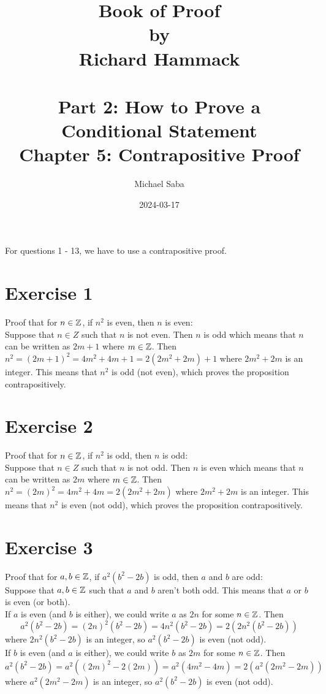 \documentclass[12pt]{article}
\title{%
    \Huge Book of Proof \\
    \large by \\
    \Large Richard Hammack \\~\\
    \huge Part 2: How to Prove a Conditional Statement \\
    \LARGE Chapter 5: Contrapositive Proof
}
\date{2024-03-17}
\author{Michael Saba}
\begin{document}
    \maketitle
    \newpage
    \setlength{\parindent}{0pt}

    For questions 1 - 13, we have to use a contrapositive proof. \\

    \section*{Exercise 1}
    Proof that for $n \in \mathbb{Z}$,
    if $n^2$ is even,
    then $n$ is even: \\
    Suppose that $n \in Z$ 
    such that $n$ is not even.
    Then $n$ is odd which means
    that $n$ can be written as $2m + 1$ where $m \in \mathbb{Z}$.
    Then $n^2 = (2m+1)^2 = 4m^2 + 4m + 1 = 2(2m^2 + 2m) + 1$
    where $2m^2 + 2m$ is an integer.
    This means that $n^2$ is odd (not even),
    which proves the proposition contrapositively.

    \section*{Exercise 2}
    Proof that for $n \in \mathbb{Z}$,
    if $n^2$ is odd,
    then $n$ is odd: \\
    Suppose that $n \in Z$ 
    such that $n$ is not odd.
    Then $n$ is even which means
    that $n$ can be written as $2m$ where $m \in \mathbb{Z}$.
    Then $n^2 = (2m)^2 = 4m^2 + 4m = 2(2m^2 + 2m)$
    where $2m^2 + 2m$ is an integer.
    This means that $n^2$ is even (not odd),
    which proves the proposition contrapositively.

    \section*{Exercise 3}
    Proof that for $a, b \in \mathbb{Z}$,
    if $a^2(b^2 - 2b)$ is odd,
    then $a$ and $b$ are odd: \\
    Suppose that $a, b \in \mathbb{Z}$
    such that $a$ and $b$ aren't both odd. 
    This means that $a$ or $b$ is even (or both). \\
    If $a$ is even (and $b$ is either),
    we could write $a$ as $2n$ for some $n \in \mathbb{Z}$.
    Then
    \[ a^2(b^2 - 2b) = (2n)^2(b^2 - 2b)
    = 4n^2(b^2 - 2b) = 2(2n^2(b^2 - 2b)) \]
    where $2n^2(b^2 - 2b)$ is an integer,
    so $a^2(b^2 - 2b)$ is even (not odd). \\
    If $b$ is even (and $a$ is either),
    we could write $b$ as $2m$ for some $n \in \mathbb{Z}$.
    Then
    \[ a^2(b^2 - 2b) = a^2((2m)^2 - 2(2m))
    = a^2(4m^2 - 4m) = 2(a^2(2m^2 - 2m)) \]
    where $a^2(2m^2 - 2m)$ is an integer,
    so $a^2(b^2 - 2b)$ is even (not odd). \\
\end{document}
